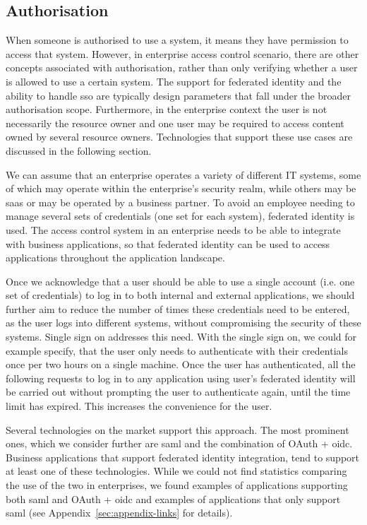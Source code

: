 \subsection{Authorisation}\label{sec:analysis-authorisation}

When someone is authorised to use a system, it means they have permission to access that system. However, in enterprise access control scenario, there are other concepts associated with authorisation, rather than only verifying whether a user is allowed to use a certain system. The support for federated identity and the ability to handle \acrfull{sso} are typically design parameters that fall under the broader authorisation scope. Furthermore, in the enterprise context the user is not necessarily the resource owner and one user may be required to access content owned by several resource owners. Technologies that support these use cases are discussed in the following section.

We can assume that an enterprise operates a variety of different IT systems, some of which may operate within the enterprise's security realm, while others may be \acrshort{saas} or may be operated by a business partner. To avoid an employee needing to manage several sets of credentials (one set for each system), federated identity is used. The access control system in an enterprise needs to be able to integrate with business applications, so that federated identity can be used to access applications throughout the application landscape.

Once we acknowledge that a user should be able to use a single account (i.e. one set of credentials) to log in to both internal and external applications, we should further aim to reduce the number of times these credentials need to be entered, as the user logs into different systems, without compromising the security of these systems. Single sign on addresses this need. With the single sign on, we could for example specify, that the user only needs to authenticate with their credentials once per two hours on a single machine. Once the user has authenticated, all the following requests to log in to any application using user's federated identity will be carried out without prompting the user to authenticate again, until the time limit has expired. This increases the convenience for the user.

Several technologies on the market support this approach. The most prominent ones, which we consider further are \acrshort{saml} and the combination of OAuth + \acrshort{oidc}. Business applications that support federated identity integration, tend to support at least one of these technologies. While we could not find statistics comparing the use of the two in enterprises, we found examples of applications supporting both \acrshort{saml} and OAuth + \acrshort{oidc} and examples of applications that only support \acrshort{saml} (see Appendix~\ref{sec:appendix-links} for details). 


